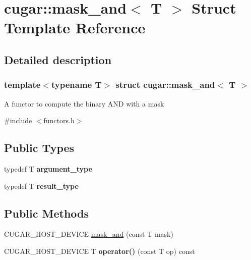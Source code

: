 \hypertarget{structcugar_1_1mask__and}{}\section{cugar\+:\+:mask\+\_\+and$<$ T $>$ Struct Template Reference}
\label{structcugar_1_1mask__and}


\subsection{Detailed description}
\subsubsection*{template$<$typename T$>$\newline
struct cugar\+::mask\+\_\+and$<$ T $>$}

A functor to compute the binary A\+ND with a mask 

{\ttfamily \#include $<$functors.\+h$>$}

\subsection*{Public Types}
\begin{DoxyCompactItemize}
\item 
\mbox{\label{structcugar_1_1mask__and_a7e87a5f74a4613e38a80c4ec3ee43c59}} 
typedef T {\bfseries argument\+\_\+type}
\item 
\mbox{\label{structcugar_1_1mask__and_aeefdd7599afa1de58b6dc6536a74df98}} 
typedef T {\bfseries result\+\_\+type}
\end{DoxyCompactItemize}
\subsection*{Public Methods}
\begin{DoxyCompactItemize}
\item 
C\+U\+G\+A\+R\+\_\+\+H\+O\+S\+T\+\_\+\+D\+E\+V\+I\+CE \hyperlink{structcugar_1_1mask__and_ad7325adf41f11077c85317fbcd75e848}{mask\+\_\+and} (const T mask)
\item 
\mbox{\label{structcugar_1_1mask__and_af2c59b51cddfbf663314fb43f7056ce3}} 
C\+U\+G\+A\+R\+\_\+\+H\+O\+S\+T\+\_\+\+D\+E\+V\+I\+CE T {\bfseries operator()} (const T op) const
\end{DoxyCompactItemize}


